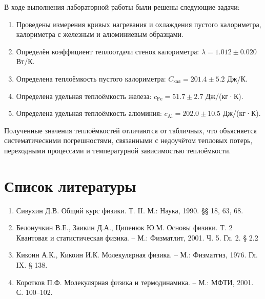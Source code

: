 \documentclass{article}
\begin{document}
В ходе выполнения лабораторной работы были решены следующие задачи:
\begin{enumerate}
\item Проведены измерения кривых нагревания и охлаждения пустого калориметра, калориметра с железным и алюминиевым образцами.
\item Определён коэффициент теплоотдачи стенок калориметра: $\lambda = 1.012 \pm 0.020$ Вт/К.
\item Определена теплоёмкость пустого калориметра: $C_{\text{кал}} = 201.4 \pm 5.2$ Дж/К.
\item Определена удельная теплоёмкость железа: $c_{\text{Fe}} = 51.7 \pm 2.7$ Дж/(кг·К).
\item Определена удельная теплоёмкость алюминия: $c_{\text{Al}} = 202.0 \pm 10.5$ Дж/(кг·К).
\end{enumerate}

Полученные значения теплоёмкостей отличаются от табличных, что объясняется систематическими погрешностями, связанными с недоучётом тепловых потерь, переходными процессами и температурной зависимостью теплоёмкости.

\section*{Список литературы}

\begin{enumerate}
\item Сивухин Д.В. Общий курс физики. Т. II. М.: Наука, 1990. §§ 18, 63, 68.
\item Белонучкин В.Е., Заикин Д.А., Ципенюк Ю.М. Основы физики. Т. 2 Квантовая и статистическая физика. – М.: Физматлит, 2001. Ч. 5. Гл. 2. § 2.2
\item Кикоин А.К., Кикоин И.К. Молекулярная физика. – М.: Физматгиз, 1976. Гл. IX. § 138.
\item Коротков П.Ф. Молекулярная физика и термодинамика. – М.: МФТИ, 2001. С. 100–102.
\end{enumerate}
\end{document}
